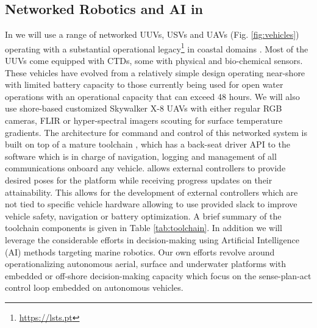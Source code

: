 \subsection{Networked Robotics  and AI  in \proje}

In \proj we will use a range of networked UUVs, USVs and UAVs
(Fig. \ref{fig:vehicles}) operating with a substantial operational
legacy\footnote{\url{https://lsts.pt}} in coastal domains
\cite{pinto13,pinto14,sousa16,Ferreira2018,Pinto2018MultipleAV,pinto21}.
Most of the UUVs come equipped with CTDs, some with physical and
bio-chemical sensors. These vehicles have evolved from a relatively
simple design operating near-shore \cite{sousa2012lauv} with limited
battery capacity to those currently being used for open water
operations with an operational capacity that can exceed 48 hours. We
will also use shore-based customized Skywalker X-8 UAVs with either
regular RGB cameras, FLIR or hyper-spectral imagers scouting for
surface temperature gradients. The architecture for command and
control of this networked system is built on top of a mature toolchain
\cite{pinto2013lsts}, which has a back-seat driver API to the \du
software which is in charge of navigation, logging and management of
all communications onboard any vehicle. \du allows external
controllers to provide desired poses for the platform while receiving
progress updates on their attainability.  This allows for the
development of external controllers which are not tied to specific
vehicle hardware allowing \du to use provided slack to improve vehicle
safety, navigation or battery optimization. A brief summary of the
toolchain components is given in Table \ref{tab:toolchain}. In
addition we will leverage the considerable efforts in decision-making
using Artificial Intelligence (AI) methods targeting marine
robotics. Our own efforts revolve around operationalizing autonomous
aerial, surface and underwater platforms with embedded or off-shore
decision-making capacity which focus on the sense-plan-act control
loop embedded on autonomous vehicles.


